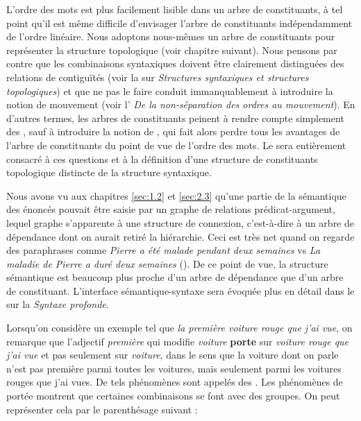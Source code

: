 {     
    L’ordre des mots est plus facilement lisible dans un arbre de constituants, à tel point qu’il est même difficile d’envisager l’arbre de constituants indépendamment de l’ordre linéaire. Nous adoptons nous-mêmes un arbre de constituants pour représenter la structure topologique (voir chapitre suivant). Nous pensons par contre que les combinaisons syntaxiques doivent être clairement distinguées des relations de contiguïtés (voir la  sur \textit{Structures syntaxiques et structures topologiques}) et que ne pas le faire conduit immanquablement à introduire la notion de mouvement (voir l' \textit{De la non-séparation des ordres au mouvement}). En d’autres termes, les arbres de constituants peinent à rendre compte simplement des , sauf à introduire la notion de , qui fait alors perdre tous les avantages de l’arbre de constituants du point de vue de l’ordre des mots. Le  sera entièrement consacré à ces questions et à la définition d’une structure de constituants topologique distincte de la structure syntaxique.

    Nous avons vu aux chapitres \ref{sec:1.2} et \ref{sec:2.3} qu’une partie de la sémantique des énoncés pouvait être saisie par un graphe de relations prédicat-argument, lequel graphe s’apparente à une structure de connexion, c’est-à-dire à un arbre de dépendance dont on aurait retiré la hiérarchie. Ceci est très net quand on regarde des paraphrases comme \textit{Pierre a été malade pendant deux semaines} vs \textit{La maladie de Pierre a duré deux semaines} (). De ce point de vue, la structure sémantique est beaucoup plus proche d’un arbre de dépendance que d’un arbre de constituant. L'interface sémantique-syntaxe sera évoquée plus en détail dans le  sur la \textit{Syntaxe profonde}.

    Lorsqu’on considère un exemple tel que \textit{la première voiture rouge que j’ai vue}, on remarque que l’adjectif \textit{première} qui modifie \textit{voiture} \textbf{porte} sur \textit{voiture rouge que j’ai vue} et pas seulement sur \textit{voiture}, dans le sens que la voiture dont on parle n’est pas première parmi toutes les voitures, mais seulement parmi les voitures rouges que j’ai vues. De tels phénomènes sont appelés des . Les phénomènes de portée montrent que certaines combinaisons se font avec des groupes. On peut représenter cela par le parenthésage suivant :
    
}
